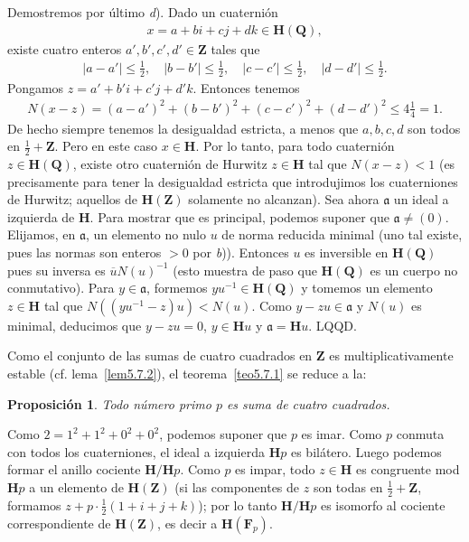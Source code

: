 \documentclass[bibtotoc,leqno,spanish]{amsbook}
\newcommand{\QQ}{\mathbf{Q}}
\newcommand{\ZZ}{\mathbf{Z}}
\newcommand{\FF}{\mathbf{F}}
\newcommand{\HH}{\mathbf{H}}
\newcommand{\idl}[1]{\mathfrak{#1}}
\newcommand{\QED}{LQQD.}
\newcommand{\oline}[1]{\overline{#1}}
\newcommand{\abs}[1]{\left\lvert#1\right\rvert}
\numberwithin{equation}{section}
\theoremstyle{note}
\theoremstyle{note}
\newtheorem{proposition}{Proposici\'on}
\theoremstyle{rem}
\numberwithin{theorem}{section}
\numberwithin{proposition}{section}
\numberwithin{definition}{section}
\numberwithin{lemma}{section}
\numberwithin{corollary}{section}
\numberwithin{example}{section}
\numberwithin{footnote}{section}%
\begin{document}
Demostremos por \'ultimo {\itshape d}). Dado un cuaterni\'on
\begin{gather*}
x=a+bi+cj+dk\in\HH(\QQ),
\end{gather*}
existe cuatro enteros $a',b',c',d'\in\ZZ$ tales que
\begin{gather*}
\abs{a-a'}\leq\frac{1}{2},\quad\abs{b-b'}\leq\frac{1}{2},\quad\abs{c-c'}\leq\frac{1}{2},\quad
\abs{d-d'}\leq\frac{1}{2}.
\end{gather*}
Pongamos $z = a'+b'i+c'j+d'k$. Entonces tenemos
\begin{gather*}
N(x-z) = (a-a')^{2}+(b-b')^{2}+(c-c')^{2}+(d-d')^{2}\leq 4\frac{1}{4}=1.
\end{gather*}
De hecho siempre tenemos la desigualdad estricta, a menos que $a,b,c,d$ son todos en $\frac{1}{2}+\ZZ$.
Pero en este caso $x\in\HH$. Por lo tanto, para todo cuaterni\'on $z\in\HH(\QQ)$, existe otro cuaterni\'on de
Hurwitz $z\in\HH$ tal que $N(x-z) < 1$ (es precisamente para tener la desigualdad estricta que introdujimos
los cuaterniones de Hurwitz; aquellos de $\HH(\ZZ)$ solamente no alcanzan). Sea ahora $\idl{a}$ un
ideal a izquierda de $\HH$. Para mostrar que es principal, podemos suponer que $\idl{a}\neq(0)$. Elijamos,
en $\idl{a}$, un elemento no nulo $u$ de norma reducida minimal (uno tal existe, pues las normas son
enteros $>0$ por {\itshape b})). Entonces $u$ es inversible en $\HH(\QQ)$ pues su inversa es
$\oline uN(u)^{-1}$ (esto muestra de paso que $\HH(\QQ)$ es un cuerpo no conmutativo). Para $y\in\idl{a}$,
formemos $yu^{-1}\in\HH(\QQ)$ y tomemos un elemento $z\in\HH$ tal que $N((yu^{-1}-z)u)<N(u)$.
Como $y-zu\in\idl{a}$ y $N(u)$ es minimal, deducimos que $y-zu=0$, $y\in\HH u$ y $\idl{a} = \HH u$. \QED

Como el conjunto de las sumas de cuatro cuadrados en $\ZZ$ es multiplicativamente estable
(cf. lema~\ref{lem5.7.2}), el teorema~\ref{teo5.7.1} se reduce a la:

\begin{proposition}
Todo n\'umero primo $p$ es suma de cuatro cuadrados.
\end{proposition}

Como $2 = 1^{2}+1^{2}+0^{2}+0^{2}$, podemos suponer que $p$ es imar. Como $p$ conmuta con todos los
cuaterniones, el ideal a izquierda $\HH p$ es bil\'atero. Luego podemos formar el anillo cociente
$\HH/\HH p$. Como $p$ es impar, todo $z\in\HH$ es congruente mod $\HH p$ a un elemento de $\HH(\ZZ)$
(si las componentes de $z$ son todas en $\frac{1}{2}+\ZZ$, formamos $z+p\cdot\frac{1}{2}(1+i+j+k)$);
por lo tanto $\HH/\HH p$ es isomorfo al cociente correspondiente de $\HH(\ZZ)$, es decir a $\HH(\FF_{p})$.
\end{document}
